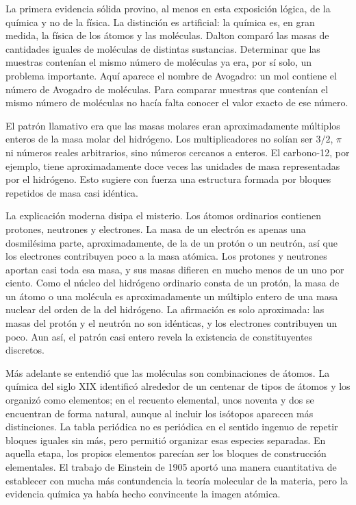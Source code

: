 La primera evidencia sólida provino, al menos en esta exposición lógica, de la química y no de la física. La distinción es artificial: la química es, en gran medida, la física de los átomos y las moléculas. Dalton comparó las masas de cantidades iguales de moléculas de distintas sustancias. Determinar que las muestras contenían el mismo número de moléculas ya era, por sí solo, un problema importante. Aquí aparece el nombre de Avogadro: un mol contiene el número de Avogadro de moléculas. Para comparar muestras que contenían el mismo número de moléculas no hacía falta conocer el valor exacto de ese número.

El patrón llamativo era que las masas molares eran aproximadamente múltiplos enteros de la masa molar del hidrógeno. Los multiplicadores no solían ser \(3/2\), \(\pi\) ni números reales arbitrarios, sino números cercanos a enteros. El carbono-12, por ejemplo, tiene aproximadamente doce veces las unidades de masa representadas por el hidrógeno. Esto sugiere con fuerza una estructura formada por bloques repetidos de masa casi idéntica.

La explicación moderna disipa el misterio. Los átomos ordinarios contienen protones, neutrones y electrones. La masa de un electrón es apenas una dosmilésima parte, aproximadamente, de la de un protón o un neutrón, así que los electrones contribuyen poco a la masa atómica. Los protones y neutrones aportan casi toda esa masa, y sus masas difieren en mucho menos de un uno por ciento. Como el núcleo del hidrógeno ordinario consta de un protón, la masa de un átomo o una molécula es aproximadamente un múltiplo entero de una masa nuclear del orden de la del hidrógeno. La afirmación es solo aproximada: las masas del protón y el neutrón no son idénticas, y los electrones contribuyen un poco. Aun así, el patrón casi entero revela la existencia de constituyentes discretos.

Más adelante se entendió que las moléculas son combinaciones de átomos. La química del siglo XIX identificó alrededor de un centenar de tipos de átomos y los organizó como elementos; en el recuento elemental, unos noventa y dos se encuentran de forma natural, aunque al incluir los isótopos aparecen más distinciones. La tabla periódica no es periódica en el sentido ingenuo de repetir bloques iguales sin más, pero permitió organizar esas especies separadas. En aquella etapa, los propios elementos parecían ser los bloques de construcción elementales. El trabajo de Einstein de 1905 aportó una manera cuantitativa de establecer con mucha más contundencia la teoría molecular de la materia, pero la evidencia química ya había hecho convincente la imagen atómica.

